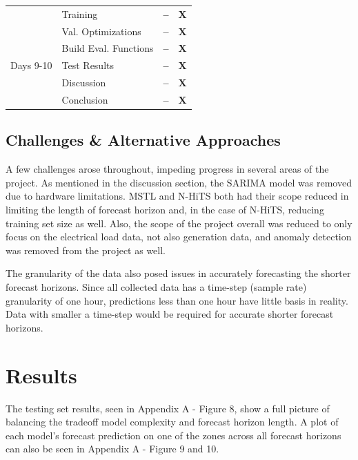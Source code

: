 \documentclass[sigconf]{acmart}
\begin{document}
\begin{table}[hbt!]
\begin{tabular}{ll | c | c}
   & \hspace{3mm}Training &\textbf{--} & \textbf{X} \\  
   & \hspace{3mm}Val. Optimizations &\textbf{--} & \textbf{X}\\  
   & Build Eval. Functions & \textbf{--} & \textbf{X} \\  
   \cmidrule(rl){2-4} 
  Days 9-10 & Test Results & \textbf{--} & \textbf{X} \\  
  \cmidrule(rl){1-4} 
   & Discussion & \textbf{--} & \textbf{X} \\
   \cmidrule(rl){2-4}   
   & Conclusion & \textbf{--} & \textbf{X} \\  
   \cmidrule(rl){2-4} 
  \bottomrule
\end{tabular}
\end{table}

\subsection{Challenges \& Alternative Approaches}
A few challenges arose throughout, impeding progress in several areas of the project. As mentioned in the discussion section, the SARIMA model was removed due to hardware limitations. MSTL and N-HiTS both had their scope reduced in limiting the length of forecast horizon and, in the case of N-HiTS, reducing training set size as well. Also, the scope of the project overall was reduced to only focus on the electrical load data, not also generation data, and anomaly detection was removed from the project as well.

The granularity of the data also posed issues in accurately forecasting the shorter forecast horizons. Since all collected data has a time-step (sample rate) granularity of one hour, predictions less than one hour have little basis in reality. Data with smaller a time-step would be required for accurate shorter forecast horizons.

\section{Results}

The testing set results, seen in Appendix A - Figure 8, show a full picture of balancing the tradeoff model complexity and forecast horizon length. A plot of each model's forecast prediction on one of the zones across all forecast horizons can also be seen in Appendix A - Figure 9 and 10.
\end{document}
